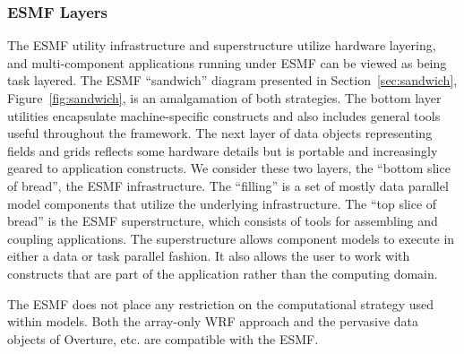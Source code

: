 \subsubsection{ESMF Layers}

The ESMF utility infrastructure and superstructure utilize hardware layering, 
and multi-component applications running under ESMF can be viewed as 
being task layered.  The ESMF ``sandwich'' diagram presented in 
Section~\ref{sec:sandwich}, Figure~\ref{fig:sandwich}, is an amalgamation 
of both strategies.  The bottom layer utilities encapsulate 
machine-specific constructs and also includes general tools useful throughout
the framework.  The next layer of data objects representing
fields and grids reflects some hardware details but is portable and increasingly
geared to application constructs.  We consider these two layers, the ``bottom
slice of bread'', the ESMF infrastructure.  The ``filling'' is a set of 
mostly data parallel model components that utilize the underlying 
infrastructure.  The ``top slice of bread'' is the ESMF superstructure, 
which consists of tools for assembling and coupling applications.  The 
superstructure allows component models to execute in either a data or task 
parallel fashion.  It also allows the user to work with constructs that are part
of the application rather than the computing domain.  

The ESMF does not place any restriction on the computational strategy used 
within models.  Both the array-only WRF approach and the pervasive data 
objects of Overture, etc. are compatible with the ESMF.





